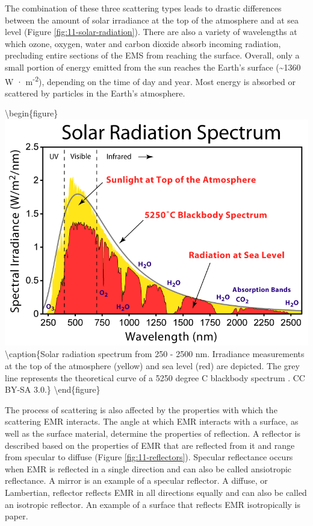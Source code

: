 \documentclass[
]{book}
\begin{document}
The combination of these three scattering types leads to drastic
differences between the amount of solar irradiance at the top of the
atmosphere and at sea level (Figure \ref{fig:11-solar-radiation}).
There are also a variety of wavelengths at which ozone, oxygen, water
and carbon dioxide absorb incoming radiation, precluding entire
sections of the EMS from reaching the surface. Overall, only a small
portion of energy emitted from the sun reaches the Earth's surface
(\textasciitilde1360 W · m\textsuperscript{-2}), depending on the time of day and year. Most
energy is absorbed or scattered by particles in the Earth's
atmosphere.

\textbackslash begin\{figure\}
\includegraphics[width=11.11in]{images/11-solar-radiation} \textbackslash caption\{Solar radiation spectrum from 250 - 2500 nm. Irradiance measurements at the top of the atmosphere (yellow) and sea level (red) are depicted. The grey line represents the theoretical curve of a 5250 degree C blackbody spectrum \citep{rohde_solar_2008}. CC BY-SA 3.0.\}\label{fig:11-solar-radiation}
\textbackslash end\{figure\}

The process of scattering is also affected by the properties with which
the scattering EMR interacts. The angle at which EMR interacts with a
surface, as well as the surface material, determine the properties of
reflection. A reflector is described based on the properties of EMR that
are reflected from it and range from specular to diffuse (Figure
\ref{fig:11-reflectors}). Specular reflectance occurs when EMR is
reflected in a single direction and can also be called ansiotropic
reflectance. A mirror is an example of a specular reflector. A diffuse,
or Lambertian, reflector reflects EMR in all directions equally and can
also be called an isotropic reflector. An example of a surface that
reflects EMR isotropically is paper.
\end{document}
